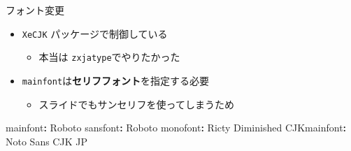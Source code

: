 \documentclass[
  12pt,
  ignorenonframetext,
]{beamer}
\newenvironment{Shaded}{\begin{snugshade}}{\end{snugshade}}
\newcommand{\AttributeTok}[1]{\textcolor[rgb]{0.77,0.63,0.00}{#1}}
\newcommand{\FunctionTok}[1]{\textcolor[rgb]{0.00,0.00,0.00}{#1}}
\newcommand{\KeywordTok}[1]{\textcolor[rgb]{0.13,0.29,0.53}{\textbf{#1}}}
\providecommand{\tightlist}{%
  \setlength{\itemsep}{0pt}\setlength{\parskip}{0pt}}
\begin{document}
\begin{frame}[fragile]{フォント変更}
\protect\hypertarget{ux30d5ux30a9ux30f3ux30c8ux5909ux66f4}{}

\begin{itemize}
\tightlist
\item
  \texttt{XeCJK} パッケージで制御している

  \begin{itemize}
  \tightlist
  \item
    本当は \texttt{zxjatype}でやりたかった
  \end{itemize}
\item
  \texttt{mainfont}は\textbf{セリフフォント}を指定する必要

  \begin{itemize}
  \tightlist
  \item
    スライドでもサンセリフを使ってしまうため
  \end{itemize}
\end{itemize}

\begin{Shaded}
\begin{Highlighting}[]
\FunctionTok{mainfont}\KeywordTok{:}\AttributeTok{ Roboto}
\FunctionTok{sansfont}\KeywordTok{:}\AttributeTok{ Roboto}
\FunctionTok{monofont}\KeywordTok{:}\AttributeTok{ Ricty Diminished}
\FunctionTok{CJKmainfont}\KeywordTok{:}\AttributeTok{ Noto Sans CJK JP}
\end{Highlighting}
\end{Shaded}

\end{frame}
\end{document}
